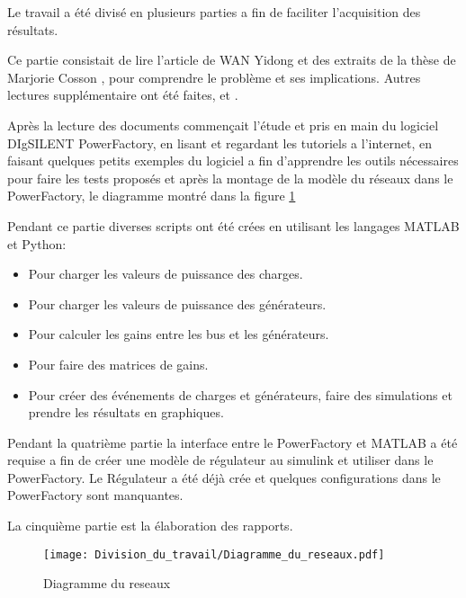 
Le travail a été divisé en plusieurs parties a fin de faciliter l'acquisition des résultats.

Ce partie consistait de lire l'article de WAN Yidong \cite{yidong} et des extraits de la thèse de Marjorie  Cosson \cite{cosson:tel-01374469}, pour comprendre le problème et ses implications. Autres lectures supplémentaire ont été faites, \cite{farina2015model} et \cite{mariani2013controllo}.

Après la lecture des documents commençait l'étude et pris en main du logiciel DIgSILENT PowerFactory, en lisant et regardant les tutoriels a l'internet, en faisant quelques petits exemples du logiciel a fin d'apprendre les outils nécessaires pour faire les tests proposés et après la montage de la modèle du réseaux dans le PowerFactory, le diagramme montré dans la figure \ref{fig:Diagramme_du_reseaux} 

Pendant ce partie diverses scripts ont été crées en utilisant les langages MATLAB et Python:
\begin{itemize}
\item Pour charger les valeurs de puissance des charges.
\item Pour charger les valeurs de puissance des générateurs.
\item Pour calculer les gains entre les bus et les générateurs.
\item Pour faire des matrices de gains.
\item Pour créer des événements de charges et générateurs, faire des simulations et prendre les résultats en graphiques.
\end{itemize}

Pendant la quatrième partie la interface entre le PowerFactory et MATLAB a été requise a fin de créer une modèle de régulateur au simulink et utiliser dans le PowerFactory. Le Régulateur a été déjà crée et quelques configurations dans le PowerFactory sont manquantes.


La cinquième partie est la élaboration des rapports.



\begin{figure}[H]
	\begin{center}	
		\texttt{[image: Division\_du\_travail/Diagramme\_du\_reseaux.pdf]}
		\caption{Diagramme du reseaux}
		\label{fig:Diagramme_du_reseaux}
	\end{center}
\end{figure}
\pagebreak